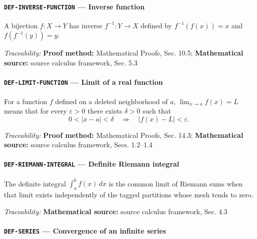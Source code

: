 \documentclass[10pt]{article}
\newcommand{\pidraw}[1]{\begingroup\urlstyle{tt}\nolinkurl{#1}\endgroup}
\theoremstyle{definition}
\theoremstyle{remark}
\begin{document}
\paragraph{\pidraw{DEF-INVERSE-FUNCTION} --- Inverse function}

A bijection $f:X\to Y$ has inverse $f^{-1}:Y\to X$ defined by $f^{-1}(f(x))=x$ and $f(f^{-1}(y))=y$.

\smallskip\noindent\textit{Traceability:} \textbf{Proof method:} Mathematical Proofs, Sec. 10.5; \textbf{Mathematical source:} source calculus framework, Sec. 5.3\par

\label{prf:DEF-LIMIT-FUNCTION}

\paragraph{\pidraw{DEF-LIMIT-FUNCTION} --- Limit of a real function}

For a function $f$ defined on a deleted neighborhood of $a$, $\lim_{x\to a}f(x)=L$ means that for every $\varepsilon>0$ there exists $\delta>0$ such that
\[
0<|x-a|<\delta\quad\Longrightarrow\quad |f(x)-L|<\varepsilon.
\]

\smallskip\noindent\textit{Traceability:} \textbf{Proof method:} Mathematical Proofs, Sec. 14.3; \textbf{Mathematical source:} source calculus framework, Secs. 1.2--1.4\par

\label{prf:DEF-RIEMANN-INTEGRAL}

\paragraph{\pidraw{DEF-RIEMANN-INTEGRAL} --- Definite Riemann integral}

The definite integral $\int_a^b f(x)\,dx$ is the common limit of Riemann sums when that limit exists independently of the tagged partitions whose mesh tends to zero.

\smallskip\noindent\textit{Traceability:} \textbf{Mathematical source:} source calculus framework, Sec. 4.3\par

\label{prf:DEF-SERIES}

\paragraph{\pidraw{DEF-SERIES} --- Convergence of an infinite series}
\end{document}
